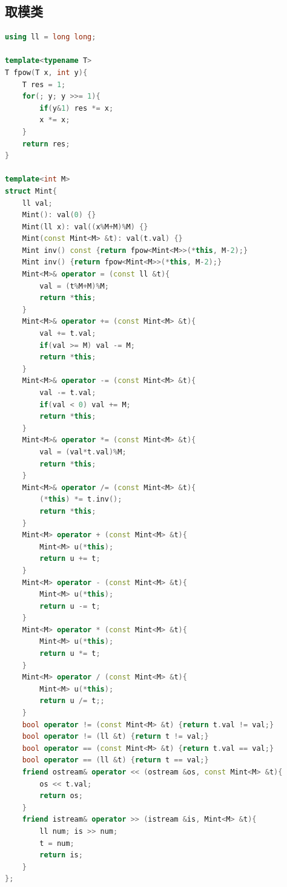 \subsection{取模类}

\begin{lstlisting}[language=C++]
using ll = long long;

template<typename T>
T fpow(T x, int y){
    T res = 1;
    for(; y; y >>= 1){
        if(y&1) res *= x;
        x *= x;
    }
    return res;
}

template<int M>
struct Mint{
    ll val;
    Mint(): val(0) {}
    Mint(ll x): val((x%M+M)%M) {}
    Mint(const Mint<M> &t): val(t.val) {}
    Mint inv() const {return fpow<Mint<M>>(*this, M-2);}
    Mint inv() {return fpow<Mint<M>>(*this, M-2);}
    Mint<M>& operator = (const ll &t){
        val = (t%M+M)%M;
        return *this;
    }
    Mint<M>& operator += (const Mint<M> &t){
        val += t.val;
        if(val >= M) val -= M;
        return *this;
    }
    Mint<M>& operator -= (const Mint<M> &t){
        val -= t.val;
        if(val < 0) val += M;
        return *this;
    }
    Mint<M>& operator *= (const Mint<M> &t){
        val = (val*t.val)%M;
        return *this;
    }
    Mint<M>& operator /= (const Mint<M> &t){
        (*this) *= t.inv();
        return *this;
    }
    Mint<M> operator + (const Mint<M> &t){
        Mint<M> u(*this);
        return u += t;
    }
    Mint<M> operator - (const Mint<M> &t){
        Mint<M> u(*this);
        return u -= t;
    }
    Mint<M> operator * (const Mint<M> &t){
        Mint<M> u(*this);
        return u *= t;
    }
    Mint<M> operator / (const Mint<M> &t){
        Mint<M> u(*this);
        return u /= t;;
    }
    bool operator != (const Mint<M> &t) {return t.val != val;}
    bool operator != (ll &t) {return t != val;}
    bool operator == (const Mint<M> &t) {return t.val == val;}
    bool operator == (ll &t) {return t == val;}
    friend ostream& operator << (ostream &os, const Mint<M> &t){
        os << t.val;
        return os;
    }
    friend istream& operator >> (istream &is, Mint<M> &t){
        ll num; is >> num;
        t = num;
        return is;
    }
};
\end{lstlisting}





